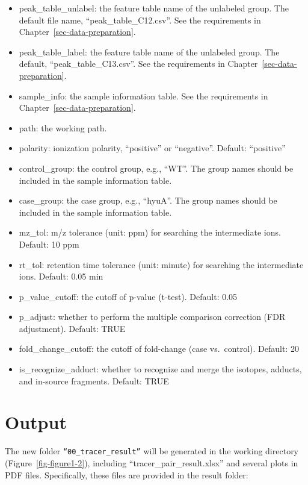\documentclass[
  letterpaper,
  DIV=11,
  numbers=noendperiod]{scrreprt}
\providecommand{\tightlist}{%
  \setlength{\itemsep}{0pt}\setlength{\parskip}{0pt}}
\begin{document}
\begin{itemize}
\tightlist
\item
  peak\_table\_unlabel: the feature table name of the unlabeled group.
  The default file name, ``peak\_table\_C12.csv''. See the requirements
  in Chapter~\ref{sec-data-preparation}.
\item
  peak\_table\_label: the feature table name of the unlabeled group. The
  default, ``peak\_table\_C13.csv''. See the requirements in
  Chapter~\ref{sec-data-preparation}.
\item
  sample\_info: the sample information table. See the requirements in
  Chapter~\ref{sec-data-preparation}.
\item
  path: the working path.
\item
  polarity: ionization polarity, ``positive'' or ``negative''. Default:
  ``positive''
\item
  control\_group: the control group, e.g., ``WT''. The group names
  should be included in the sample information table.
\item
  case\_group: the case group, e.g., ``hyuA''. The group names should be
  included in the sample information table.
\item
  mz\_tol: m/z tolerance (unit: ppm) for searching the intermediate
  ions. Default: 10 ppm
\item
  rt\_tol: retention time tolerance (unit: minute) for searching the
  intermediate ions. Default: 0.05 min
\item
  p\_value\_cutoff: the cutoff of p-value (t-test). Default: 0.05
\item
  p\_adjust: whether to perform the multiple comparison correction (FDR
  adjustment). Default: TRUE
\item
  fold\_change\_cutoff: the cutoff of fold-change (case vs.~control).
  Default: 20
\item
  is\_recognize\_adduct: whether to recognize and merge the isotopes,
  adducts, and in-source fragments. Default: TRUE
\end{itemize}

\section{Output}\label{sec-isoPairFinder-output}

The new folder \texttt{“00\_tracer\_result”} will be generated in the
working directory (Figure~\ref{fig-figure1-2}), including
``tracer\_pair\_result.xlsx'' and several plots in PDF files.
Specifically, these files are provided in the result folder:
\end{document}
